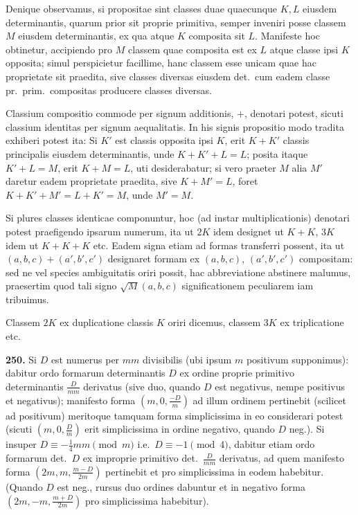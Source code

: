 \documentclass[12pt,a4paper]{article}
\theoremstyle{plain}
\theoremstyle{definition}
\theoremstyle{remark}
\theoremstyle{problemstyle}
\begin{document}
Denique observamus, si propositae sint classes duae quaecunque $K, L$ eiusdem determinantis, quarum prior sit proprie primitiva, semper inveniri posse classem $M$ eiusdem determinantis, ex qua atque $K$ composita sit $L$. Manifeste hoc obtinetur, accipiendo pro $M$ classem quae composita est ex $L$ atque classe ipsi $K$ opposita; simul perspicietur facillime, hanc classem esse unicam quae hac proprietate sit praedita, sive classes diversas eiusdem det.\ cum eadem classe pr.\ prim.\ compositas producere classes diversas.

Classium compositio commode per signum additionis, $+$, denotari potest, sicuti classium identitas per signum aequalitatis. In his signis propositio modo tradita exhiberi potest ita: Si $K'$ est classis opposita ipsi $K$, erit $K + K'$ classis principalis eiusdem determinantis, unde $K + K' + L = L$; posita itaque $K' + L = M$, erit $K + M = L$, uti desiderabatur; si vero praeter $M$ alia $M'$ daretur eadem proprietate praedita, sive $K + M' = L$, foret $K + K' + M' = L + K' = M$, unde $M' = M$.

Si plures classes identicae componuntur, hoc (ad instar multiplicationis) denotari potest praefigendo ipsarum numerum, ita ut $2K$ idem designet ut $K + K$, $3K$ idem ut $K + K + K$ etc. Eadem signa etiam ad formas transferri possent, ita ut $(a, b, c) + (a', b', c')$ designaret formam ex $(a, b, c)$, $(a', b', c')$ compositam: sed ne vel species ambiguitatis oriri possit, hac abbreviatione abstinere malumus, praesertim quod tali signo $\sqrt{M}(a, b, c)$ significationem peculiarem iam tribuimus.

Classem $2K$ ex duplicatione classis $K$ oriri dicemus, classem $3K$ ex triplicatione etc.


\textbf{250.} Si $D$ est numerus per $mm$ divisibilis (ubi ipsum $m$ positivum supponimus): dabitur ordo formarum determinantis $D$ ex ordine proprie primitivo determinantis $\frac{D}{mm}$ derivatus (sive duo, quando $D$ est negativus, nempe positivus et negativus); manifesto forma $(m, 0, \frac{-D}{m})$ ad illum ordinem pertinebit (scilicet ad positivum) meritoque tamquam forma simplicissima in eo considerari potest (sicuti $(m, 0, \frac{D}{m})$ erit simplicissima in ordine negativo, quando $D$ neg.). Si insuper $D \equiv -\tfrac{1}{4}mm \pmod{m}$ i.e.\ $D \equiv -1 \pmod{4}$, dabitur etiam ordo formarum det.\ $D$ ex improprie primitivo det.\ $\frac{D}{mm}$ derivatus, ad quem manifesto forma $(2m, m, \frac{m - D}{2m})$ pertinebit et pro simplicissima in eodem habebitur. (Quando $D$ est neg., rursus duo ordines dabuntur et in negativo forma $(2m, -m, \frac{m + D}{2m})$ pro simplicissima habebitur).
\end{document}
